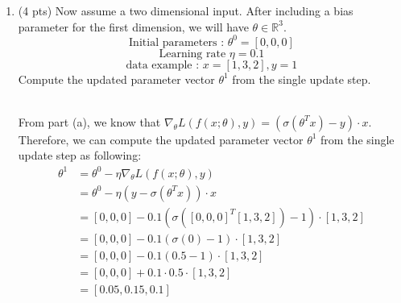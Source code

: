 \documentclass[a4paper]{article}
\theoremstyle{definition}
\newenvironment{soln}{
    \leavevmode\color{blue}\ignorespaces
}{}
\begin{document}
\begin{enumerate}
\begin{enumerate}
	\item (4 pts)
 Now assume a two dimensional input. After including a bias parameter for the first dimension, we will have $\theta\in\mathbb{R}^3$.
$$ \text{Initial parameters : }  \theta^{0}=[0, 0, 0]$$
$$ \text{Learning rate }\eta=0.1$$
$$ \text{data example : } x=[1, 3, 2], y=1$$
Compute the updated parameter vector $\theta^{1}$ from the single update step.
	
	\begin{soln}\\
	From part (a), we know that $\nabla_{\theta} L(f(x;\theta), y) = ( \sigma(\theta^T x) - y) \cdot x$. Therefore, we can compute the updated parameter vector $\theta^{1}$ from the single update step as following:\\
	\begin{align*}
	\theta^{1} &= \theta^{0} - \eta \nabla_{\theta} L(f(x;\theta), y)\\
	&= \theta^0 - \eta (y - \sigma(\theta^T x)) \cdot x\\
	&= [0, 0, 0] - 0.1 ( \sigma([0, 0, 0]^T [1, 3, 2])-1) \cdot [1, 3, 2]\\
	&= [0, 0, 0] - 0.1 ( \sigma(0)-1) \cdot [1, 3, 2]\\
	&= [0, 0, 0] - 0.1 ( 0.5- 1 ) \cdot [1, 3, 2]\\
	&= [0, 0, 0] + 0.1 \cdot 0.5 \cdot [1, 3, 2]\\
	&= [0.05, 0.15, 0.1]\\
	\end{align*}
	\end{soln}
\end{enumerate}
\end{enumerate}
\end{document}

